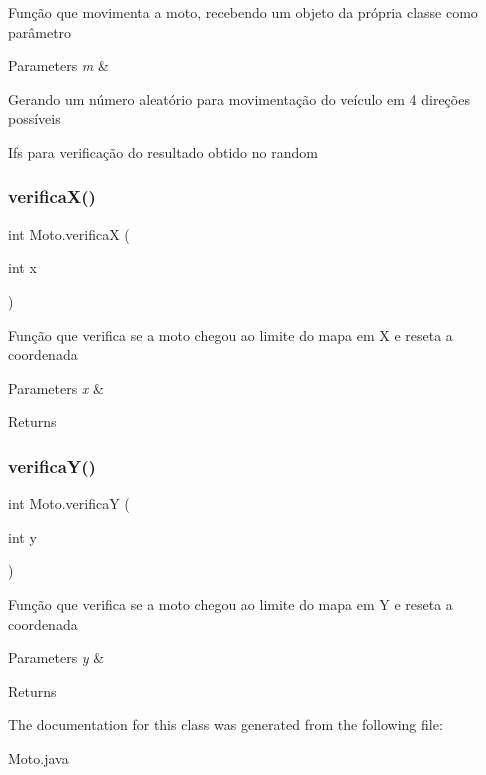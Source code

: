Função que movimenta a moto, recebendo um objeto da própria classe como parâmetro 
\begin{DoxyParams}{Parameters}
{\em m} & \\
\hline
\end{DoxyParams}
Gerando um número aleatório para movimentação do veículo em 4 direções possíveis

Ifs para verificação do resultado obtido no random\mbox{\label{classMoto_a56bf604e45484d316f4a472254370289}} 
\subsubsection{\texorpdfstring{verifica\+X()}{verificaX()}}
{\footnotesize\ttfamily int Moto.\+verificaX (\begin{DoxyParamCaption}\item[{int}]{x }\end{DoxyParamCaption})\hspace{0.3cm}{\ttfamily [inline]}}

Função que verifica se a moto chegou ao limite do mapa em X e reseta a coordenada 
\begin{DoxyParams}{Parameters}
{\em x} & \\
\hline
\end{DoxyParams}
\begin{DoxyReturn}{Returns}

\end{DoxyReturn}
\mbox{\label{classMoto_a6933149c85bd01bad40a0e4e0052a430}} 
\subsubsection{\texorpdfstring{verifica\+Y()}{verificaY()}}
{\footnotesize\ttfamily int Moto.\+verificaY (\begin{DoxyParamCaption}\item[{int}]{y }\end{DoxyParamCaption})\hspace{0.3cm}{\ttfamily [inline]}}

Função que verifica se a moto chegou ao limite do mapa em Y e reseta a coordenada 
\begin{DoxyParams}{Parameters}
{\em y} & \\
\hline
\end{DoxyParams}
\begin{DoxyReturn}{Returns}

\end{DoxyReturn}


The documentation for this class was generated from the following file\+:\begin{DoxyCompactItemize}
\item 
Moto.\+java\end{DoxyCompactItemize}
